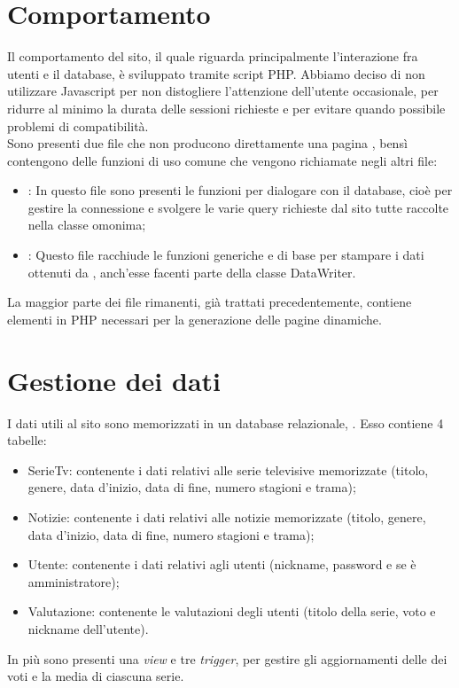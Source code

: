 \documentclass{tecweb}
\begin{document}
	\section{Comportamento}
	Il comportamento del sito, il quale riguarda principalmente l'interazione fra utenti e il database, è sviluppato tramite script PHP. Abbiamo deciso di non utilizzare Javascript per non distogliere l'attenzione dell'utente occasionale, per ridurre al minimo la durata delle sessioni richieste e per evitare quando possibile problemi di compatibilità.\\
	Sono presenti due file che non producono direttamente una pagina , bensì contengono delle funzioni di uso comune che vengono richiamate negli altri file:
	\begin{itemize}
		\item {}: In questo file sono presenti le funzioni per dialogare con il database, cioè per gestire la connessione e svolgere le varie query richieste dal sito tutte raccolte nella classe omonima;
		\item {}: Questo file racchiude le funzioni generiche e di base per stampare i dati ottenuti da , anch'esse facenti parte della classe DataWriter.
	\end{itemize}
	La maggior parte dei file rimanenti, già trattati precedentemente, contiene elementi in PHP necessari per la generazione delle pagine  dinamiche.
	\newpage
	\section{Gestione dei dati}
	I dati utili al sito sono memorizzati in un database relazionale, . Esso contiene 4 tabelle:
	\begin{itemize}
		\item SerieTv: contenente i dati relativi alle serie televisive memorizzate (titolo, genere, data d'inizio, data di fine, numero stagioni e trama);
		\item Notizie: contenente i dati relativi alle notizie  memorizzate (titolo, genere, data d'inizio, data di fine, numero stagioni e trama);
		\item Utente: contenente i dati relativi agli utenti (nickname, password e se è amministratore);
		\item Valutazione: contenente le valutazioni degli utenti (titolo della serie, voto e nickname dell'utente).
	\end{itemize}
	In più sono presenti una \textit{view} e tre \textit{trigger}, per gestire gli aggiornamenti delle dei voti e la media di ciascuna serie.
	
\end{document}

